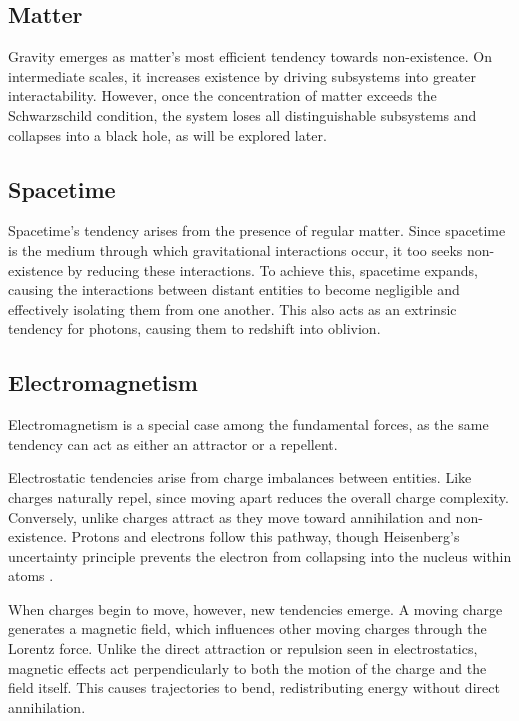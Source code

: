 \documentclass{article}
\begin{document}
\subsection{Matter}

Gravity emerges as matter's most efficient tendency towards non-existence. 
On intermediate scales, it increases existence by driving subsystems into greater interactability. 
However, once the concentration of matter exceeds the Schwarzschild condition, the system loses all distinguishable subsystems and collapses into a black hole, as will be explored later.


\subsection{Spacetime}

Spacetime’s tendency arises from the presence of regular matter. 
Since spacetime is the medium through which gravitational interactions occur, it too seeks non-existence by reducing these interactions. 
To achieve this, spacetime expands, causing the interactions between distant entities 
to become negligible and effectively isolating them from one another.
This also acts as an extrinsic tendency for photons, causing them to redshift into oblivion.


\subsection{Electromagnetism}

Electromagnetism is a special case among the fundamental forces, as the same tendency can act as either an attractor or a repellent.

Electrostatic tendencies arise from charge imbalances between entities. 
Like charges naturally repel, since moving apart reduces the overall charge complexity. 
Conversely, unlike charges attract as they move toward annihilation and non-existence. 
Protons and electrons follow this pathway, though Heisenberg’s uncertainty principle prevents the electron from collapsing into the nucleus within atoms \cite{Heisenberg2007}.

When charges begin to move, however, new tendencies emerge. 
A moving charge generates a magnetic field, which influences other moving charges through the Lorentz force. 
Unlike the direct attraction or repulsion seen in electrostatics, magnetic effects act perpendicularly to both the motion of the charge and the field itself. 
This causes trajectories to bend, redistributing energy without direct annihilation. 
\end{document}
